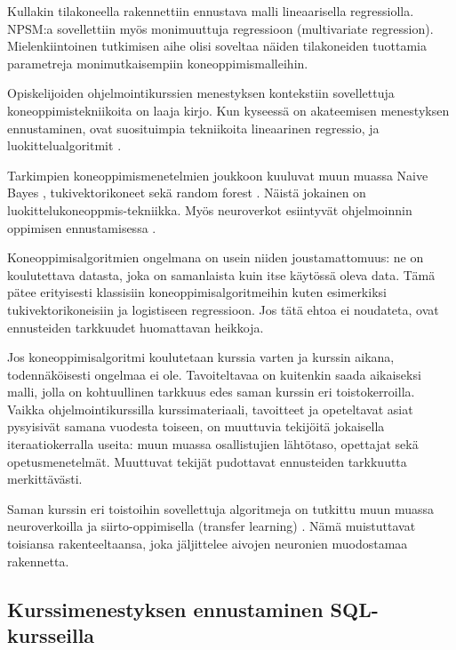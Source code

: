 \documentclass[finnish,twoside,openright]{HYgraduMLDS}
\begin{document}
Kullakin tilakoneella rakennettiin ennustava malli lineaarisella regressiolla. NPSM:a sovellettiin myös monimuuttuja regressioon (multivariate regression). Mielenkiintoinen tutkimisen aihe olisi soveltaa näiden tilakoneiden tuottamia parametreja monimutkaisempiin koneoppimismalleihin.

Opiskelijoiden ohjelmointikurssien menestyksen kontekstiin sovellettuja koneoppimistekniikoita on laaja kirjo. Kun kyseessä on akateemisen menestyksen ennustaminen, ovat suosituimpia tekniikoita lineaarinen regressio, ja luokittelualgoritmit \cite{hellas2018predicting}. 

Tarkimpien koneoppimismenetelmien joukkoon kuuluvat muun muassa Naive Bayes \cite{bergin2015using}, tukivektorikoneet \cite{bergin2015using} sekä random forest \cite{lagus2018transfer}. Näistä jokainen on luokittelukoneoppmis-tekniikka. Myös neuroverkot esiintyvät ohjelmoinnin oppimisen ennustamisessa \cite{Castro-Wunsch:2017:ENN:3017680.3017792}. 

Koneoppimisalgoritmien ongelmana on usein niiden joustamattomuus: ne on koulutettava datasta, joka on samanlaista kuin itse käytössä oleva data. Tämä pätee erityisesti klassisiin koneoppimisalgoritmeihin kuten esimerkiksi tukivektorikoneisiin ja logistiseen regressioon. Jos tätä ehtoa ei noudateta, ovat ennusteiden tarkkuudet huomattavan heikkoja. 

Jos koneoppimisalgoritmi koulutetaan kurssia varten ja kurssin aikana, todennäköisesti ongelmaa ei ole. Tavoiteltavaa on kuitenkin saada aikaiseksi malli, jolla on kohtuullinen tarkkuus edes saman kurssin eri toistokerroilla. Vaikka ohjelmointikurssilla kurssimateriaali, tavoitteet ja opeteltavat asiat pysyisivät samana vuodesta toiseen, on muuttuvia tekijöitä jokaisella iteraatiokerralla useita: muun muassa osallistujien lähtötaso, opettajat sekä opetusmenetelmät. Muuttuvat tekijät pudottavat ennusteiden tarkkuutta merkittävästi. 

Saman kurssin eri toistoihin sovellettuja algoritmeja on tutkittu muun muassa neuroverkoilla \cite{Castro-Wunsch:2017:ENN:3017680.3017792} ja siirto-oppimisella (transfer learning) \cite{lagus2018transfer}. Nämä muistuttavat toisiansa rakenteeltaansa, joka jäljittelee aivojen neuronien muodostamaa rakennetta.


\subsection{Kurssimenestyksen ennustaminen SQL-kursseilla}
\end{document}
